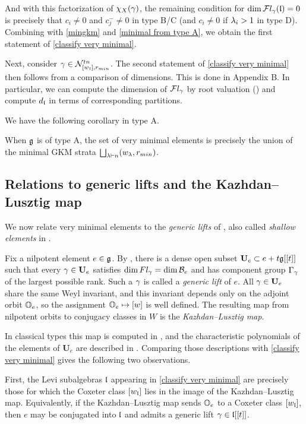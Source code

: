 \documentclass[11pt]{article}
\numberwithin{equation}{section}
\begin{document}
And with this factorization of $\chi_X(\gamma)$, the remaining condition for $\dim \mathcal{F}l_\gamma(\mathfrak{l})=0$ is precisely that $c_i\neq 0$ and $c_j^-\neq 0$ in type B/C (and $c_i\neq 0$ if $\lambda_i>1$ in type D). Combining with \cref{mingkm} and \cref{minimal from type A}, we obtain the first statement of \cref{classify very minimal}.

Next, consider $\gamma \in \mathcal{N}^{tn}_{[w_{\mathfrak{l}}],r_{min}}$. The second statement of \cref{classify very minimal} then follows from a comparison of dimensions. This is done in Appendix B. In particular, we can compute the dimension of $\mathcal{F}l_\gamma$ by root valuation (\cite{dimensionASF}) and compute $d_{\mathfrak{l}}$ in terms of corresponding partitions.    

We have the following corollary in type A.
\begin{cor}\label{minimal RT type A}
    When $\mathfrak{g}$ is of type A, the set of very minimal elements is precisely the union of the minimal GKM strata $\bigsqcup_{\lambda \vdash n}(w_\lambda, r_{min})$. 
\end{cor}

\subsection{Relations to generic lifts and the Kazhdan--Lusztig map}
We now relate very minimal elements to the \textit{generic lifts} of \cite{KL88}, also called
\textit{shallow elements} in \cite{Yun2021}.

Fix a nilpotent element $e\in\mathfrak{g}$. By \cite{KL88}, there is a dense open subset
$\mathbf{U}_e\subset e+t\mathfrak{g}[[t]]$ such
that every $\gamma\in\mathbf{U}_e$ satisfies $\dim Fl_\gamma=\dim \mathcal{B}_e$ and has component group $\Gamma_\gamma$
of the largest possible rank. Such a $\gamma$ is called a \emph{generic lift} of $e$. All
$\gamma\in\mathbf{U}_e$ share the same Weyl invariant, and this invariant depends only on the
adjoint orbit $\mathbb{O}_e$, so the assignment $\mathbb{O}_e\mapsto[w]$ is well defined. The resulting map
from nilpotent orbits to conjugacy classes in $W$ is the \textit{Kazhdan--Lusztig map}.

In classical types this map is computed in
\cite[Theorems A and B]{Spaltenstein1988PolynomialsLocalFields}, and the characteristic
polynomials of the elements of $\mathbf{U}_e$ are described in
\cite[Section 6]{Spaltenstein1988PolynomialsLocalFields}. Comparing those descriptions with
\cref{classify very minimal} gives the following two observations.

First, the Levi subalgebras $\mathfrak{l}$ appearing in \cref{classify very minimal} are precisely
those for which the Coxeter class $[w_{\mathfrak{l}}]$ lies in the image of the Kazhdan--Lusztig map.
Equivalently, if the Kazhdan--Lusztig map sends $\mathbb{O}_e$ to a Coxeter class $[w_{\mathfrak{l}}]$, then $e$
may be conjugated into $\mathfrak{l}$ and admits a generic lift $\gamma\in\mathfrak{l}[[t]]$.
\end{document}
